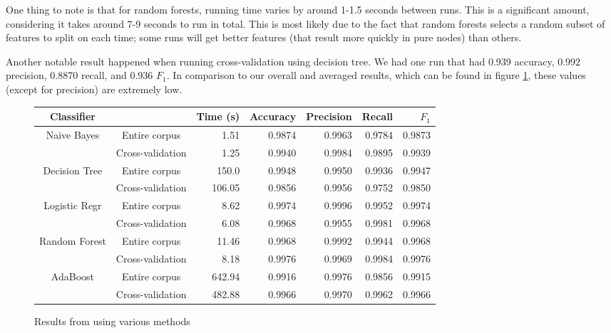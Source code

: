 \documentclass{article} %
\begin{document}
One thing to note is that for random forests, running time varies by around 1-1.5 seconds between runs. This is a significant amount, considering it takes around 7-9 seconds to run in total. This is most likely due to the fact that random forests selects a random subset of features to split on each time; some runs will get better features (that result more quickly in pure nodes) than others. 

Another notable result happened when running cross-validation using decision tree. We had one run that had 0.939 accuracy, 0.992 precision, 0.8870 recall, and 0.936 $F_1$. In comparison to our overall and averaged results, which can be found in figure \ref{fig:table}, these values (except for precision) are extremely low. 

\begin{figure}[h]
  \begin{tabular}[h]{ | c | c | r | r | r | r | r | }
    \hline
    Classifier    &                  & Time (s) & Accuracy & Precision & Recall & $F_1$  \\ \hline
    Naive Bayes   & Entire corpus    & 1.51     & 0.9874   & 0.9963    & 0.9784 & 0.9873 \\ \cline{2-7}
                  & Cross-validation & 1.25     & 0.9940   & 0.9984    & 0.9895 & 0.9939 \\ \hline
    Decision Tree & Entire corpus    & 150.0    & 0.9948   & 0.9950    & 0.9936 & 0.9947 \\ \cline{2-7}
                  & Cross-validation & 106.05   & 0.9856   & 0.9956    & 0.9752 & 0.9850 \\ \hline
    Logistic Regr & Entire corpus    & 8.62     & 0.9974   & 0.9996    & 0.9952 & 0.9974 \\ \cline{2-7}
                  & Cross-validation & 6.08     & 0.9968   & 0.9955    & 0.9981 & 0.9968 \\ \hline
    Random Forest & Entire corpus    & 11.46    & 0.9968   & 0.9992    & 0.9944 & 0.9968 \\ \cline{2-7}
                  & Cross-validation & 8.18     & 0.9976   & 0.9969    & 0.9984 & 0.9976 \\ \hline
    AdaBoost      & Entire corpus    & 642.94   & 0.9916   & 0.9976    & 0.9856 & 0.9915 \\ \cline{2-7}
                  & Cross-validation & 482.88   & 0.9966   & 0.9970    & 0.9962 & 0.9966 \\ \hline
  \end{tabular}
  \caption{Results from using various methods}
  \label{fig:table}
\end{figure}
\end{document}

